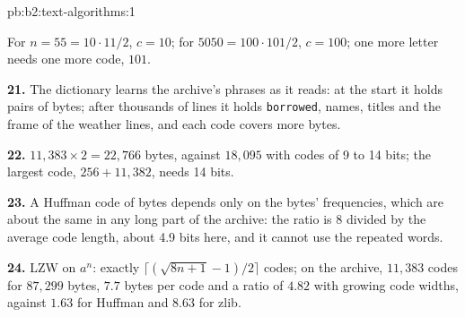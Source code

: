 \begin{solution}{pb:b2:text-algorithms:1}

For $n = 55 = 10 \cdot 11/2$, $c = 10$; for $5050 = 100 \cdot
101/2$, $c = 100$; one more letter needs one more code, $101$.

\textbf{21.} The dictionary learns the archive's phrases as it reads: at the start it holds pairs of bytes; after
thousands of lines it holds \texttt{borrowed\textvisiblespace}, names, titles and the frame of the weather lines, and
each code covers more bytes.

\textbf{22.} $11{,}383 \times 2 = 22{,}766$ bytes, against $18{,}095$ with codes of 9 to 14 bits; the largest code,
$256 + 11{,}382$, needs 14 bits.

\textbf{23.} A Huffman code of bytes depends only on the bytes' frequencies, which are about the same in any long part
of the archive: the ratio is $8$ divided by the average code length, about 4.9 bits here, and it cannot use the
repeated words.

\textbf{24.} LZW on $a^n$: exactly $\lceil (\sqrt{8n+1}-1)/2 \rceil$ codes; on the archive, $11{,}383$ codes for
$87{,}299$ bytes, $7.7$ bytes per code and a ratio of $4.82$ with growing code widths, against $1.63$ for Huffman and
$8.63$ for zlib.
\end{solution}
